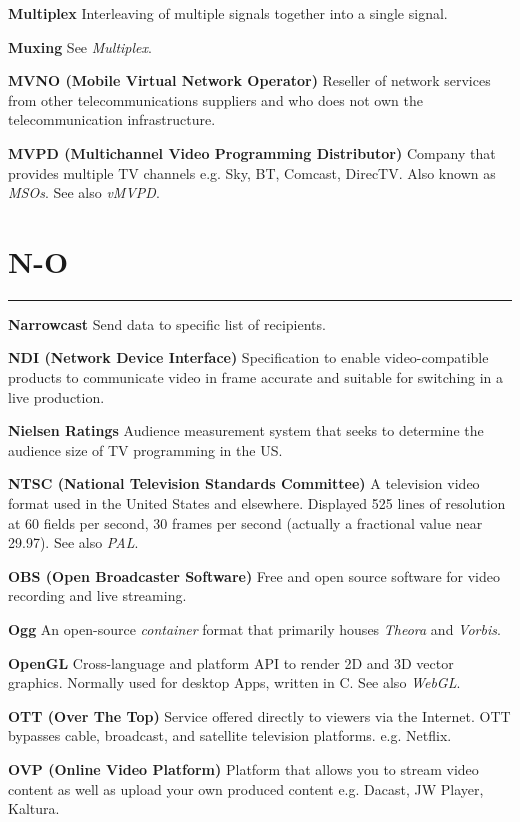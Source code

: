 \smallskip
\textbf{Multiplex}
Interleaving of multiple signals together into a single signal.

\smallskip
\textbf{Muxing}
See \textit{Multiplex}.

\smallskip
\textbf{MVNO (Mobile Virtual Network Operator)}
Reseller of network services from other telecommunications suppliers and who does not own the telecommunication infrastructure.

\smallskip
\textbf{MVPD (Multichannel Video Programming Distributor)}
Company that provides multiple TV channels e.g. Sky, BT, Comcast, DirecTV. Also known as \textit{MSOs}. See also \textit{vMVPD}.


\section{N-O}
\hrule

\medskip
\textbf{Narrowcast}
Send data to specific list of recipients.

\smallskip
\textbf{NDI (Network Device Interface)}
Specification to enable video-compatible products to communicate video in frame accurate and suitable for switching in a live production.

\medskip
\textbf{Nielsen Ratings}
Audience measurement system that seeks to determine the audience size of TV programming in the US.

\smallskip
\textbf{NTSC (National Television Standards Committee)}
A television video format used in the United States and elsewhere. Displayed 525 lines of resolution at 60 fields per second, 30 frames per second (actually a fractional value near 29.97). See also \textit{PAL}.

\smallskip
\textbf{OBS (Open Broadcaster Software)}
Free and open source software for video recording and live streaming.

\smallskip
\textbf{Ogg}
An open-source \textit{container} format that primarily houses \textit{Theora} and \textit{Vorbis}.

\smallskip
\textbf{OpenGL}
Cross-language and platform API to render 2D and 3D vector graphics.  Normally used for desktop Apps, written in C. See also \textit{WebGL}.

\smallskip
\textbf{OTT (Over The Top)}
Service offered directly to viewers via the Internet. OTT bypasses cable, broadcast, and satellite television platforms. e.g. Netflix.

\smallskip
\textbf{OVP (Online Video Platform)}
Platform that allows you to stream video content as well as upload your own produced content e.g. Dacast, JW Player, Kaltura.



